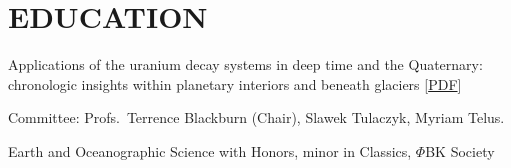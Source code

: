 \section{EDUCATION}

Applications of the uranium decay systems in deep time and the Quaternary: chronologic insights within planetary interiors and beneath glaciers [\href{https://escholarship.org/uc/item/0vp7r59z}{PDF}]

\quad Committee: Profs.~Terrence Blackburn (Chair), Slawek Tulaczyk, Myriam Telus.

Earth and Oceanographic Science with Honors, minor in Classics, $\Phi$BK Society